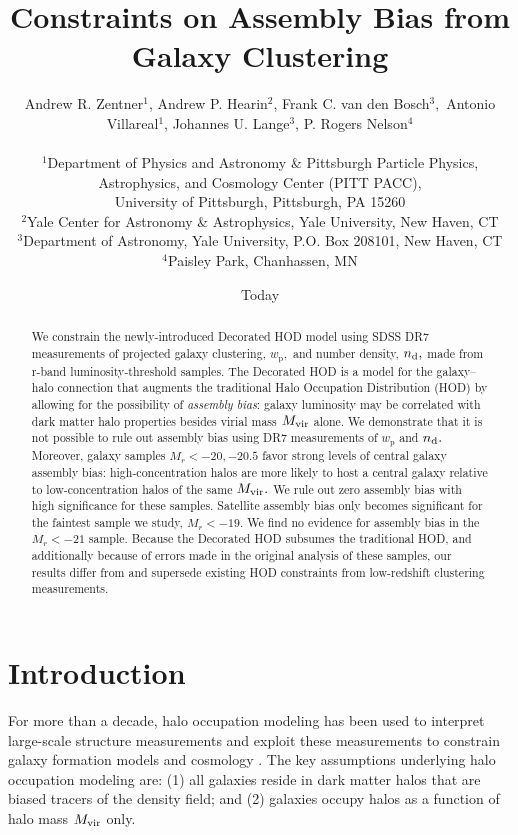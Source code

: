\documentclass[usenatbib,usegraphicx,letterpaper]{mn2e}
\title[Clustering Constraints on Assembly Bias]
{
Constraints on Assembly Bias from Galaxy Clustering
}
\author[Zentner et al.]
{Andrew R. Zentner$^{1}$, Andrew P. Hearin$^{2}$, Frank C. van den Bosch$^{3},$ \newauthor
Antonio Villareal$^{1}$, Johannes U. Lange$^{3}$, P. Rogers Nelson$^{4}$\\ \\
$^1$Department of Physics and Astronomy \& Pittsburgh Particle Physics, Astrophysics, and Cosmology Center (PITT PACC),\\ University of Pittsburgh, Pittsburgh, PA 15260\\
$^2$Yale Center for Astronomy \& Astrophysics, Yale University, New Haven, CT\\
$^3$Department of Astronomy, Yale University, P.O. Box 208101, New Haven, CT\\
$^4$Paisley Park, Chanhassen, MN\\
}
\date{Today}
\newcommand{\mvir}{M_{\rm vir}}
\newcommand{\wprp}{w_{\mathrm{p}}}
\newcommand{\magr}{M_r}
\begin{document}
\maketitle
\begin{abstract}
  We constrain the newly-introduced Decorated HOD model using SDSS DR7
  measurements of projected galaxy clustering, $\wprp,$ and number
  density, $n_{\rm d},$ made from r-band luminosity-threshold
  samples. The Decorated HOD is a model for the galaxy--halo
  connection that augments the traditional Halo Occupation
  Distribution (HOD) by allowing for the possibility of {\em assembly
    bias}: galaxy luminosity may be correlated with dark matter halo
  properties besides virial mass $\mvir$ alone. We demonstrate that it
  is not possible to rule out assembly bias using DR7 measurements of
  $\wprp$ and $n_{\rm d}.$ Moreover, galaxy samples $\magr<-20, -20.5$
  favor strong levels of central galaxy assembly bias:
  high-concentration halos are more likely to host a central galaxy
  relative to low-concentration halos of the same $\mvir.$ We rule out
  zero assembly bias with high significance for these
  samples. Satellite assembly bias only becomes significant for the
  faintest sample we study, $\magr<-19.$ We find no evidence for
  assembly bias in the $\magr<-21$ sample. Because the Decorated HOD
  subsumes the traditional HOD, and additionally because of errors
  made in the original analysis of these samples, our results differ
  from and supersede existing HOD constraints from low-redshift
  clustering measurements.
\end{abstract} 

\section{Introduction}
\label{section:introduction}

For more than a decade, halo occupation modeling has been used to
interpret large-scale structure measurements and exploit these
measurements to constrain galaxy formation models and cosmology
\citep[e.g.,][]{yang03,tinker05,zehavi05a,
  porciani06,vdBosch07,Zheng07,conroy_wechsler09,yang09b,zehavi_etal11,guo_etal11b,
  wake_etal11,yang11a,yang12,leauthaud_etal12,rod_puebla12,tinker_etal13,cacciato_etal13,
  more_etal13,guo_etal14,zu_mandelbaum15b}. The key assumptions
underlying halo occupation modeling are: (1) all galaxies reside in
dark matter halos that are biased tracers of the density field; and
(2) galaxies occupy halos as a function of halo mass $\mvir$ only. 
\end{document}
